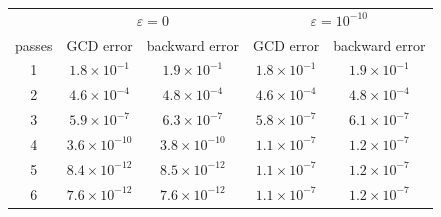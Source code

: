 \begin{tabular}{ccccc}\hline
& \multicolumn{2}{c}{$\varepsilon=0$} & \multicolumn{2}{c}{$\varepsilon=10^{-10}$}\\
passes & GCD error & backward error & GCD error & backward error\\ \hline
1 & $1.8\times 10^{-1}$ & $1.9\times 10^{-1}$ & $1.8\times 10^{-1}$ & $1.9\times 10^{-1}$\\
2 & $4.6\times 10^{-4}$ & $4.8\times 10^{-4}$ & $4.6\times 10^{-4}$ & $4.8\times 10^{-4}$\\
3 & $5.9\times 10^{-7}$ & $6.3\times 10^{-7}$ & $5.8\times 10^{-7}$ & $6.1\times 10^{-7}$\\
4 & $3.6\times 10^{-10}$ & $3.8\times 10^{-10}$ & $1.1\times 10^{-7}$ & $1.2\times 10^{-7}$\\
5 & $8.4\times 10^{-12}$ & $8.5\times 10^{-12}$ & $1.1\times 10^{-7}$ & $1.2\times 10^{-7}$\\
6 & $7.6\times 10^{-12}$ & $7.6\times 10^{-12}$ & $1.1\times 10^{-7}$ & $1.2\times 10^{-7}$\\
\hline
\end{tabular}\\[2pt]
